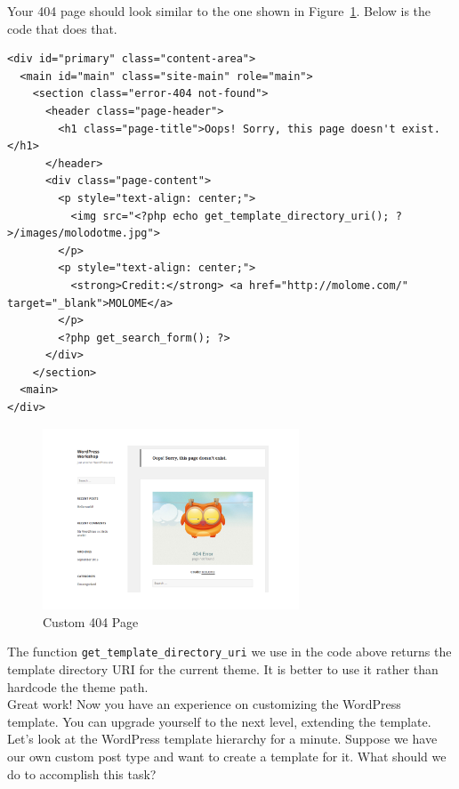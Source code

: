 \documentclass{article}
\begin{document}
\noindent Your 404 page should look similar to the one shown in
Figure~\ref{fig:custom-404-page}. Below is the code that does that.

\begin{verbatim}
<div id="primary" class="content-area">
  <main id="main" class="site-main" role="main">
    <section class="error-404 not-found">
      <header class="page-header">
        <h1 class="page-title">Oops! Sorry, this page doesn't exist.</h1>
      </header>
      <div class="page-content">
        <p style="text-align: center;">
          <img src="<?php echo get_template_directory_uri(); ?>/images/molodotme.jpg">
        </p>
        <p style="text-align: center;">
          <strong>Credit:</strong> <a href="http://molome.com/" target="_blank">MOLOME</a>
        </p>
        <?php get_search_form(); ?>
      </div>
    </section>
  <main>
</div>
\end{verbatim}

\begin{figure}[t]
    \centering
    \includegraphics[width=3in]{figures/custom-404-page}
    \caption{Custom 404 Page}
    \label{fig:custom-404-page}
\end{figure}

\noindent The function {\tt get\_template\_directory\_uri} we use in the code
above returns the template directory URI for the current theme. It is better to
use it rather than hardcode the theme path. \\

\noindent Great work! Now you have an experience on customizing the WordPress
template. You can upgrade yourself to the next level, extending the template.
\\

 Let's look at the WordPress template hierarchy for a
minute. Suppose we have our own custom post type and want to create a template
for it. What should we do to accomplish this task? \\
\end{document}
